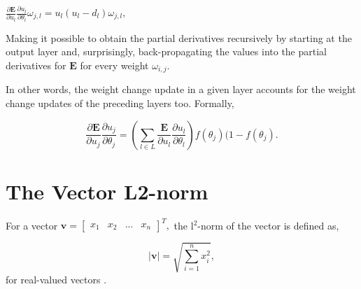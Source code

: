 \begin{center}
\begin{math}
    \frac{\partial \textbf{E}}{\partial u_l} \frac{\partial u_l}{\partial \theta_l} \omega_{j,l} = 
    u_l (u_l - d_l) \omega_{j,l},
\end{math}
\end{center}
Making it possible to obtain the partial derivatives recursively by starting at the output layer and, surprisingly, back-propagating the values into the partial derivatives for $\textbf{E}$ for every weight $\omega_{i,j}$.

In other words, the weight change update in a given layer accounts for the weight change updates of the preceding layers too. Formally,

\begin{equation}
    \frac{\partial \textbf{E}}{\partial u_j}\frac{\partial u_j}{\partial \theta_j} = 
    (\sum_{l \in L}\frac{\textbf{E}}{\partial u_l}\frac{\partial u_l}{\partial \theta_l}) f(\theta_j)(1-f(\theta_j).
\end{equation}

\section*{The Vector L2-norm}\label{l2-norm}

For a vector
\begin{math}
    \textbf{v} = \begin{bmatrix} x_1 & x_2 & ... & x_n
        \end{bmatrix}^T,
\end{math}
the l$^2$-norm of the vector is defined as,

\begin{equation}
    |\textbf{v}| = \sqrt{\sum_{i=1}^{n} x_i^2},
\end{equation}
for real-valued vectors \citep{Kreyszig2011chpt204}.

\cleardoublepage